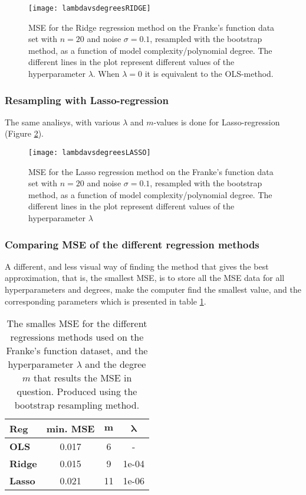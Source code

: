 \begin{figure}[htbp]
	\centering
	\texttt{[image: lambdavsdegreesRIDGE]}
	\caption{MSE for the Ridge regression method on the Franke's function data set with $n=20$ and noise $\sigma=0.1$, resampled with the bootstrap method, as a function of model complexity/polynomial degree. The different lines in the plot represent different values of the hyperparameter $\lambda$. When $\lambda=0$ it is equivalent to the OLS-method.}
	\label{fig:lambdavsdegreesRIDGE}
\end{figure}

\subsubsection{Resampling with Lasso-regression}
The same analisys, with various $\lambda$ and $m$-values is done for Lasso-regression (Figure \ref{fig:lambdavsdegreesLASSO}).
\begin{figure}[htbp]
	\centering
	\texttt{[image: lambdavsdegreesLASSO]}
	\caption{MSE for the Lasso regression method on the Franke's function data set with $n=20$ and noise $\sigma=0.1$, resampled with the bootstrap method, as a function of model complexity/polynomial degree. The different lines in the plot represent different values of the hyperparameter $\lambda$}
	\label{fig:lambdavsdegreesLASSO}
\end{figure}

\subsubsection{Comparing MSE of the different regression methods}
A different, and less visual way of finding the method that gives the best approximation, that is, the smallest MSE, is to store all the MSE data for all hyperparameters and degrees, make the computer find the smallest value, and the corresponding parameters which is presented in table \ref{tab:minerrorFRANKE}.
\begin{table}[htbp]
\caption{The smalles MSE for the different regressions methods used on the Franke's function dataset, and the hyperparameter $\lambda$ and the degree $m$ that results the MSE in question. Produced using the bootstrap resampling method.}
\centering
\begin{tabular}[width=0.5\textwidth]{lccc}
\hline
\textbf{Reg} & \textbf{min. MSE} & $\boldsymbol{m}$ & $\boldsymbol{\lambda}$ \\
\hline
\textbf{OLS} & 0.017 & 6 & - \\
\textbf{Ridge} & 0.015 & 9 & 1e-04 \\
\textbf{Lasso} & 0.021 & 11 & 1e-06
\end{tabular}
\label{tab:minerrorFRANKE}
\end{table}

